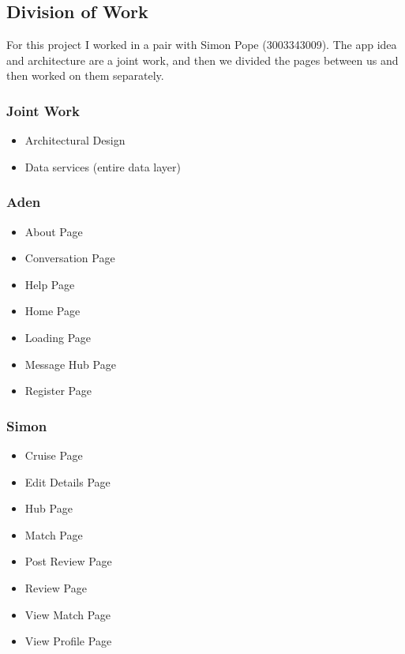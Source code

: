 \documentclass[a4paper, 11pt]{article}
\begin{document}
\subsection{Division of Work}
For this project I worked in a pair with Simon Pope (3003343009). The app idea and architecture are a joint work, and then we divided the pages between us and then worked on them separately.

\subsubsection{Joint Work}
\begin{itemize}
	\item{Architectural Design}
	\item{Data services (entire data layer)}
\end{itemize}

\subsubsection{Aden}

\begin{itemize}
	\item{About Page}
	\item{Conversation Page}
	\item{Help Page}
	\item{Home Page}
	\item{Loading Page}
	\item{Message Hub Page}
	\item{Register Page}
\end{itemize}

\subsubsection{Simon}

\begin{itemize}
	\item{Cruise Page}
	\item{Edit Details Page}
	\item{Hub Page}
	\item{Match Page}
	\item{Post Review Page}
	\item{Review Page}
	\item{View Match Page}
	\item{View Profile Page}
\end{itemize}




\end{document}

